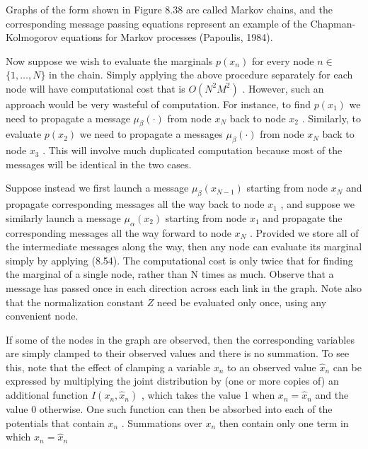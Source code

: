 \documentclass[
  10
]{article}
\begin{document}
Graphs of the form shown in Figure 8.38 are called Markov chains, and
the corresponding message passing equations represent an example of the
Chapman-Kolmogorov equations for Markov processes (Papoulis, 1984).

Now suppose we wish to evaluate the marginals \(p ( x _ { n } )\) for
every node \(n \in\) \(\{ 1 , \ldots , N \}\) in the chain. Simply
applying the above procedure separately for each node will have
computational cost that is \(O ( N ^ { 2 } M ^ { 2 } )\) . However, such
an approach would be very wasteful of computation. For instance, to find
\(p ( x _ { 1 } )\) we need to propagate a message
\(\mu _ { \beta } ( \cdot )\) from node \(x _ { N }\) back to node
\(x _ { 2 }\) . Similarly, to evaluate \(p ( x _ { 2 } )\) we need to
propagate a messages \(\mu _ { \beta } ( \cdot )\) from node
\(x _ { N }\) back to node \(x _ { 3 }\) . This will involve much
duplicated computation because most of the messages will be identical in
the two cases.

Suppose instead we first launch a message
\(\mu _ { \beta } ( x _ { N - 1 } )\) starting from node \(x _ { N }\)
and propagate corresponding messages all the way back to node
\(x _ { 1 }\) , and suppose we similarly launch a message
\(\mu _ { \alpha } ( x _ { 2 } )\) starting from node \(x _ { 1 }\) and
propagate the corresponding messages all the way forward to node
\(x _ { N }\) . Provided we store all of the intermediate messages along
the way, then any node can evaluate its marginal simply by applying
(8.54). The computational cost is only twice that for finding the
marginal of a single node, rather than N times as much. Observe that a
message has passed once in each direction across each link in the graph.
Note also that the normalization constant \(Z\) need be evaluated only
once, using any convenient node.

If some of the nodes in the graph are observed, then the corresponding
variables are simply clamped to their observed values and there is no
summation. To see this, note that the effect of clamping a variable
\(x _ { n }\) to an observed value \({ \widehat { x } } _ { n }\) can be
expressed by multiplying the joint distribution by (one or more copies
of) an additional function \(I ( x _ { n } , { \widehat x } _ { n } )\)
, which takes the value 1 when
\(x _ { n } = { \widehat { x } } _ { n }\) and the value 0 otherwise.
One such function can then be absorbed into each of the potentials that
contain \(x _ { n }\) . Summations over \(x _ { n }\) then contain only
one term in which \(x _ { n } = { \widehat { x } } _ { n }\)
\end{document}
